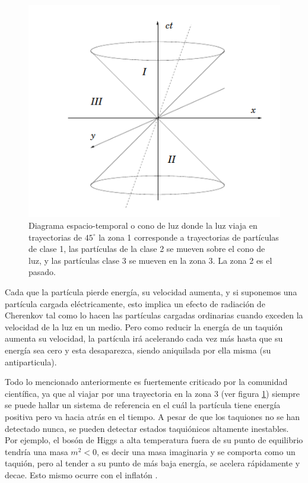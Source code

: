 \documentclass[twocolumn,preprintnumbers,amsmath,amssymb]{revtex4}
\begin{document}
\begin{figure}[htb!]
\centering
\includegraphics[width=0.9\columnwidth]{conodeluz2.png}
\caption{ Diagrama espacio-temporal o cono de luz donde la luz viaja en trayectorias de $45^{\circ}$ la zona 1 corresponde a trayectorias de partículas de clase 1, las partículas de la clase 2 se mueven sobre el cono de luz, y las partículas clase 3 se mueven en la zona 3. La zona 2 es el pasado.}
\label{fig:cono}
\end{figure}

Cada que la partícula pierde energía, su velocidad aumenta, y si suponemos una partícula cargada eléctricamente, esto implica un efecto de radiación de Cherenkov tal como lo hacen las partículas cargadas ordinarias cuando exceden la velocidad de la luz en un medio. Pero como reducir la energía de un taquión aumenta su velocidad, la partícula irá acelerando cada vez más hasta que su energía sea cero y esta desaparezca, siendo aniquilada por ella misma (su antiparticula).


Todo lo mencionado anteriormente es fuertemente criticado por la comunidad científica, ya que al viajar por una trayectoria en la zona 3 (ver figura \ref{fig:cono}) siempre se puede hallar un sistema de referencia en el cuál la partícula tiene energía positiva pero va hacia atrás en el tiempo.
A pesar de que los taquiones no se han detectado nunca, se pueden detectar estados taquiónicos altamente inestables. Por ejemplo, el bosón de Higgs a alta temperatura fuera de su punto de equilibrio tendría una masa $m^2 <0$, es decir una masa imaginaria y se comporta como un taquión, pero al tender a su punto de más baja energía, se acelera rápidamente y decae. Esto mismo ocurre con el inflatón \cite{nanni2018particle,kostelecky1988static,mazumdar2001assisted}.
\end{document}
